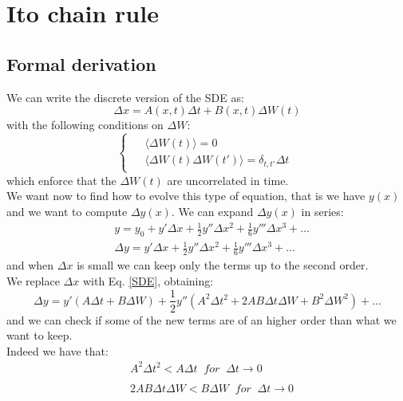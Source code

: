 \section{Ito chain rule}
\subsection{Formal derivation}
 We can write the discrete version of the SDE as:
 \begin{equation}
     \Delta x = A(x,t)\Delta t + B(x,t)\Delta W(t)
     \label{SDE}
 \end{equation}
 with the following conditions on $\Delta W$:
 \begin{equation}
     \begin{cases}
      \begin{aligned}
           & \langle \Delta W(t)\rangle = 0\\[2ex]
           & \langle \Delta W(t)\Delta W(t')\rangle = \delta_{t,t'}\Delta t
      \end{aligned}
     \end{cases}
 \end{equation}
 which enforce that the $\Delta W(t)$ are uncorrelated in time.\\
 We want now to find how to evolve this type of equation, that is we have $y(x)$ and we want to compute $\Delta y(x)$. We can expand $\Delta y(x)$ in series:
 \begin{equation}
 \begin{split}
     & y = y_0 + y'\Delta x + \frac{1}{2}y''\Delta x^2 + \frac{1}{6}y'''\Delta x^3 + \dots \\
     & \Delta y = y'\Delta x + \frac{1}{2}y''\Delta x^2 + \frac{1}{6}y'''\Delta x^3 + \dots 
 \end{split}
 \end{equation}
 and when $\Delta x$ is small we can keep only the terms up to the second order.\\
 We replace $\Delta x$ with Eq. \ref{SDE}, obtaining:
 \begin{equation}
     \Delta y = y'(A\Delta t + B\Delta W)+\frac{1}{2}y''(A^2\Delta t^2 + 2AB\Delta t\Delta W + B^2\Delta W^2) + \dots
 \end{equation}
 and we can check if some of the new terms are of an higher order than what we want to keep.\\
 Indeed we have that:
 \begin{equation}
     \begin{split}
         & A^2\Delta t^2 < A\Delta t\;\;for\;\;\Delta t\xrightarrow[]{} 0\\
         & 2AB\Delta t\Delta W < B\Delta W\;\;for\;\;\Delta t\xrightarrow[]{} 0
     \end{split}
 \end{equation}
